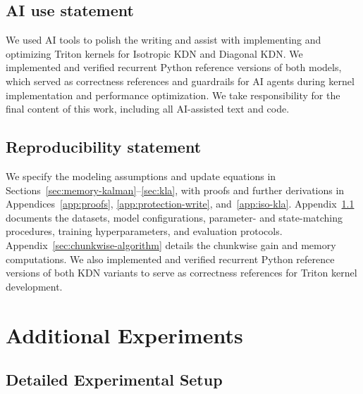 \documentclass{article} %
\begin{document}
\subsection*{AI use statement}

We used AI tools to polish the writing and assist with implementing and optimizing Triton kernels
for Isotropic KDN and Diagonal KDN. We implemented and verified recurrent Python reference
versions of both models, which served as correctness references and guardrails for AI agents
during kernel implementation and performance optimization. We take responsibility for the final
content of this work, including all AI-assisted text and code.

\subsection*{Reproducibility statement}

We specify the modeling assumptions and update equations in
Sections~\ref{sec:memory-kalman}--\ref{sec:kla}, with proofs and further derivations in
Appendices~\ref{app:proofs}, \ref{app:protection-write}, and~\ref{app:iso-kla}.
Appendix~\ref{sec:experimental-setup} documents the datasets, model configurations,
parameter- and state-matching procedures, training hyperparameters, and evaluation protocols.
Appendix~\ref{sec:chunkwise-algorithm} details the chunkwise gain and memory computations.
We also implemented and verified recurrent Python reference versions of both KDN variants to
serve as correctness references for Triton kernel development.





\appendix
\clearpage

\section{Additional Experiments}
\label{app:additional-experiments}

\subsection{Detailed Experimental Setup}
\label{sec:experimental-setup}
\end{document}
